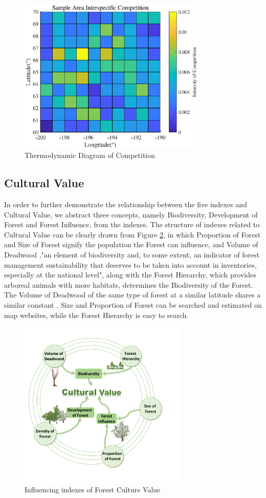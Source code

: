 \documentclass{mcmthesis}
\numberwithin{figure}{section}
\numberwithin{table}{section}
\numberwithin{equation}{section}
\begin{document}
\begin{figure}[htbp]
  \centering
  \includegraphics[width = 9cm]{code&pic/Interspecies-matrix.eps}
  \caption{Thermodynamic Diagram of Competition}\label{Matrix Douglas Fir and Pinus Densiflora}
\end{figure}

\subsection{Cultural Value}

\par
In order to further demonstrate the relationship between the five indexes and 
Cultural Value, we abstract three concepts, namely Biodiversity, Development of 
Forest and Forest Influence, from the indexes. The structure of indexes related to 
Cultural Value can be clearly drawn from Figure \ref{Index_CulVal}, 
in which Proportion of Forest and Size
of Forest signify the population the Forest can influence, and Volume of Deadwood
,"an element of biodiversity and, to some extent, an indicator of forest 
management sustainability that deserves to be taken into account in inventories,
especially at the national level"\citep{rondeux2010review}, along with the 
Forest Hierarchy, which provides arboreal 
animals with more habitats, determines the Biodiversity of the Forest.
The Volume of Deadwood of the same type of forest at a similar latitude shares a similar 
constant \citep{2007US}. Size and Proportion of Forest can be searched and estimated on 
map websites, while the Forest Hierarchy is easy to search. 
\begin{figure}[htbp]
  \centering
  \includegraphics[width = 8cm]{code&pic/Model2.pdf}
  \caption{Influencing indexes of Forest Culture Value}\label{Index_CulVal}
\end{figure}
\end{document}
